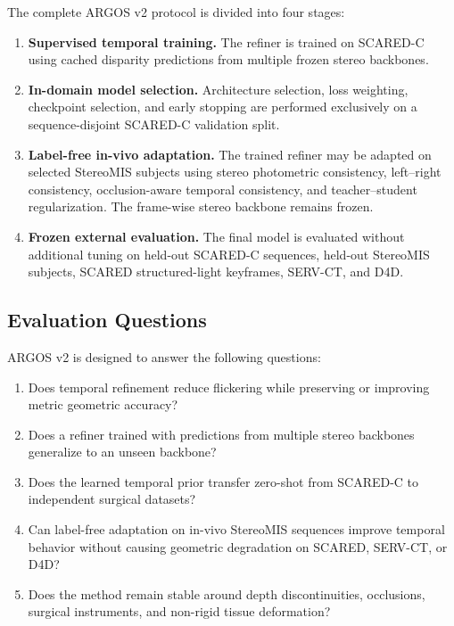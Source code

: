 \documentclass[11pt,a4paper]{article}
\begin{document}
The complete ARGOS v2 protocol is divided into four stages:

\begin{enumerate}
    \item \textbf{Supervised temporal training.}
    The refiner is trained on SCARED-C using cached disparity predictions from multiple
    frozen stereo backbones.

    \item \textbf{In-domain model selection.}
    Architecture selection, loss weighting, checkpoint selection, and early stopping are
    performed exclusively on a sequence-disjoint SCARED-C validation split.

    \item \textbf{Label-free in-vivo adaptation.}
    The trained refiner may be adapted on selected StereoMIS subjects using stereo
    photometric consistency, left--right consistency, occlusion-aware temporal consistency,
    and teacher--student regularization. The frame-wise stereo backbone remains frozen.

    \item \textbf{Frozen external evaluation.}
    The final model is evaluated without additional tuning on held-out SCARED-C sequences,
    held-out StereoMIS subjects, SCARED structured-light keyframes, SERV-CT, and D4D.
\end{enumerate}

\subsection{Evaluation Questions}

ARGOS v2 is designed to answer the following questions:

\begin{enumerate}
    \item Does temporal refinement reduce flickering while preserving or improving metric
    geometric accuracy?

    \item Does a refiner trained with predictions from multiple stereo backbones generalize
    to an unseen backbone?

    \item Does the learned temporal prior transfer zero-shot from SCARED-C to independent
    surgical datasets?

    \item Can label-free adaptation on in-vivo StereoMIS sequences improve temporal behavior
    without causing geometric degradation on SCARED, SERV-CT, or D4D?

    \item Does the method remain stable around depth discontinuities, occlusions, surgical
    instruments, and non-rigid tissue deformation?
\end{enumerate}
\end{document}
